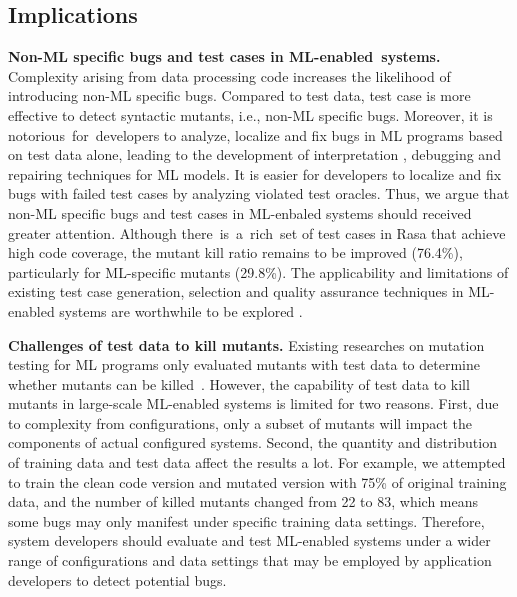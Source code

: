 \subsection{Implications}

\textbf{Non-ML specific bugs and test cases in ML-enabled~systems.} 
Complexity arising from data processing code increases the likelihood of introducing non-ML specific bugs.
Compared to test data, test case is more effective to detect syntactic mutants, i.e., non-ML specific bugs.
Moreover, it is notorious~for~developers to analyze, localize and fix bugs in ML programs based on test data alone, leading to the development of interpretation \cite{interpretability}, debugging \cite{abid2022meaningfully} and repairing \cite{sun2022causality} techniques for ML models. 
It is easier for developers to localize and fix bugs with failed test cases by analyzing violated test oracles.
Thus, we argue that non-ML specific bugs and test cases in  ML-enbaled systems should received greater attention.
Although there~is~a~rich~set of test cases in Rasa that achieve high code coverage, the mutant kill ratio remains to be improved (76.4\%), particularly for ML-specific mutants (29.8\%).
The applicability and limitations of existing test case generation, selection and quality assurance techniques in ML-enabled systems are worthwhile to be explored \cite{kazmi2017effective, di2013coverage}. 

% 

\textbf{Challenges of test data to kill mutants.}
Existing researches on mutation testing for ML programs only evaluated mutants with test data to determine whether mutants can be killed~\cite{DeepCrime,DeepMutation++,DeepMutation,mutation_evaluation,JiaMutation}.
However, the capability of test data to kill mutants in large-scale ML-enabled systems is limited for two reasons.
First, due to complexity from configurations, only a subset of mutants will impact the components of actual configured systems.
Second, the quantity and distribution of training data and test data affect the results a lot.
For example, we attempted to train the clean code version and mutated version with 75\% of original training data, and the number of killed mutants changed from 22 to 83, which means some bugs may only manifest under specific training data settings. 
Therefore, system developers should evaluate and test ML-enabled systems under a wider range of configurations and data settings that may be employed by application developers to detect potential bugs.%



